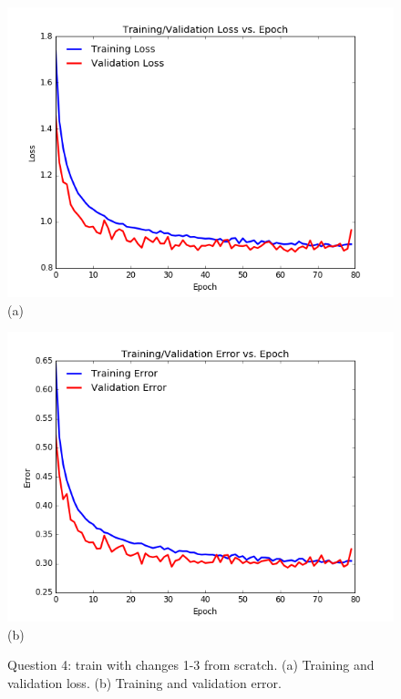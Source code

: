 \documentclass[paper=a4, fontsize=11pt]{scrartcl}
\begin{document}
\begin{figure}
\centering
\centering
 \begin{minipage}{.5\columnwidth}
\centering
  	\includegraphics[width=1\linewidth]{question4_loss.png}
  	\footnotesize{(a)}
 \end{minipage}\hfill%
\centering
 \begin{minipage}{.5\columnwidth}
\centering
  	\includegraphics[width=1\columnwidth]{question4_error.png}
  	\footnotesize{(b)}
 \end{minipage}\hfill%
\caption{Question 4: train with changes 1-3 from scratch. (a) Training and validation loss. (b) Training and validation error.}
\label{fig:question4}
\end{figure}
\end{document}
